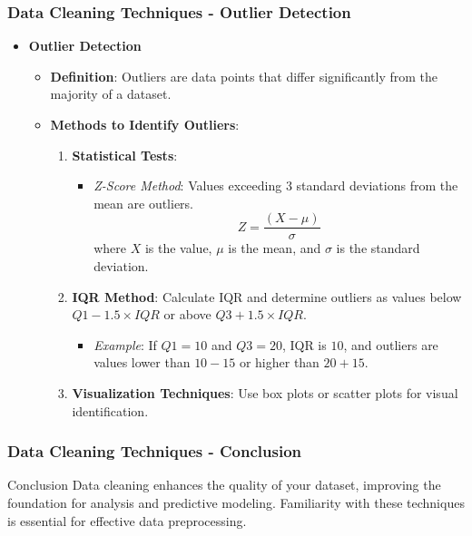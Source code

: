 \documentclass{beamer}
\begin{document}
\begin{frame}[fragile]
    \frametitle{Data Cleaning Techniques - Outlier Detection}
    \begin{itemize}
        \item \textbf{Outlier Detection}
        \begin{itemize}
            \item \textbf{Definition}: Outliers are data points that differ significantly from the majority of a dataset.
            \item \textbf{Methods to Identify Outliers}:
            \begin{enumerate}
                \item \textbf{Statistical Tests}:
                \begin{itemize}
                    \item \textit{Z-Score Method}: Values exceeding 3 standard deviations from the mean are outliers.
                    \begin{equation}
                        Z = \frac{(X - \mu)}{\sigma}
                    \end{equation}
                    where \(X\) is the value, \(\mu\) is the mean, and \(\sigma\) is the standard deviation.
                \end{itemize}
                \item \textbf{IQR Method}: Calculate IQR and determine outliers as values below \(Q1 - 1.5 \times IQR\) or above \(Q3 + 1.5 \times IQR\).
                \begin{itemize}
                    \item \textit{Example}: If \(Q1 = 10\) and \(Q3 = 20\), IQR is \(10\), and outliers are values lower than \(10 - 15\) or higher than \(20 + 15\).
                \end{itemize}
                \item \textbf{Visualization Techniques}: Use box plots or scatter plots for visual identification.
            \end{enumerate}
        \end{itemize}
    \end{itemize}
\end{frame}

\begin{frame}[fragile]
    \frametitle{Data Cleaning Techniques - Conclusion}
    \begin{block}{Conclusion}
        Data cleaning enhances the quality of your dataset, improving the foundation for analysis and predictive modeling. Familiarity with these techniques is essential for effective data preprocessing.
    \end{block}
\end{frame}
\end{document}

